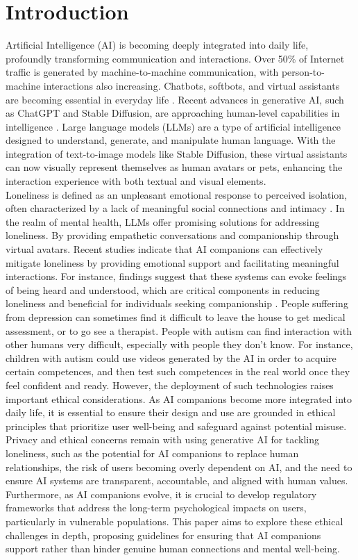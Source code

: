 \section{Introduction}
Artificial Intelligence (AI) is becoming deeply integrated into daily life, profoundly transforming communication and interactions. Over 50\% of Internet traffic is generated by machine-to-machine communication, with person-to-machine interactions also increasing. Chatbots, softbots, and virtual assistants are becoming essential in everyday life \cite{elliott2019culture}. Recent advances in generative AI, such as ChatGPT and Stable Diffusion, are approaching human-level capabilities in intelligence \cite{orru2023human}. Large language models (LLMs) are a type of artificial intelligence designed to understand, generate, and manipulate human language. With the integration of text-to-image models like Stable Diffusion, these virtual assistants can now visually represent themselves as human avatars or pets, enhancing the interaction experience with both textual and visual elements. \\
Loneliness is defined as an unpleasant emotional response to perceived isolation, often characterized by a lack of meaningful social connections and intimacy \cite{lonelinessWiki}. In the realm of mental health, LLMs offer promising solutions for addressing loneliness. By providing empathetic conversations and companionship through virtual avatars. Recent studies indicate that AI companions can effectively mitigate loneliness by providing emotional support and facilitating meaningful interactions. For instance, findings suggest that these systems can evoke feelings of being heard and understood, which are critical components in reducing loneliness \cite{strohmann2023toward} and beneficial for individuals seeking companionship \cite{odekerken2020mitigating}. People suffering from depression can sometimes find it difficult to leave the house to get medical assessment, or to go see a therapist. People with autism can find interaction with other humans very difficult, especially with people they don't know. For instance, children with autism could use videos generated by the AI in order to acquire certain competences, and then test such competences in the real world once they feel confident and ready.
However, the deployment of such technologies raises important ethical considerations. As AI companions become more integrated into daily life, it is essential to ensure their design and use are grounded in ethical principles that prioritize user well-being and safeguard against potential misuse. Privacy and ethical concerns remain with using generative AI for tackling loneliness, such as the potential for AI companions to replace human relationships, the risk of users becoming overly dependent on AI, and the need to ensure AI systems are transparent, accountable, and aligned with human values. \\
Furthermore, as AI companions evolve, it is crucial to develop regulatory frameworks that address the long-term psychological impacts on users, particularly in vulnerable populations. This paper aims to explore these ethical challenges in depth, proposing guidelines for ensuring that AI companions support rather than hinder genuine human connections and mental well-being.